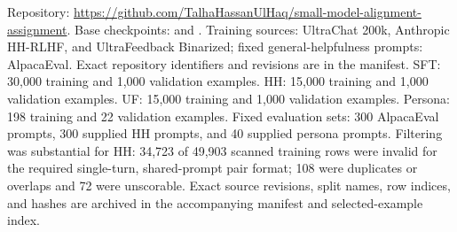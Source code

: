 Repository: \url{https://github.com/TalhaHassanUlHaq/small-model-alignment-assignment}.
Base checkpoints:  and .
Training sources: UltraChat 200k, Anthropic HH-RLHF, and UltraFeedback Binarized; fixed general-helpfulness prompts: AlpacaEval. Exact repository identifiers and revisions are in the manifest.
SFT: 30,000 training and 1,000 validation examples.
HH: 15,000 training and 1,000 validation examples.
UF: 15,000 training and 1,000 validation examples.
Persona: 198 training and 22 validation examples.
Fixed evaluation sets: 300 AlpacaEval prompts, 300 supplied HH prompts, and 40 supplied persona prompts.
Filtering was substantial for HH: 34,723 of 49,903 scanned training rows were invalid for the required single-turn, shared-prompt pair format; 108 were duplicates or overlaps and 72 were unscorable. Exact source revisions, split names, row indices, and hashes are archived in the accompanying manifest and selected-example index.
